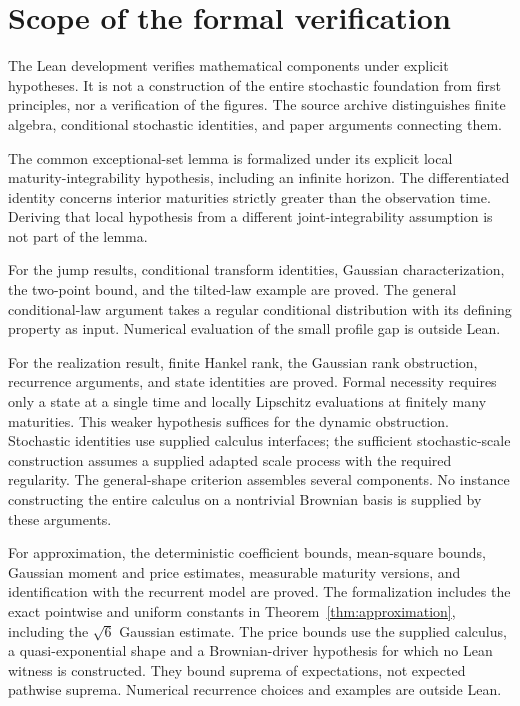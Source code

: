 \section{Scope of the formal verification}\label{app:verification}
The Lean development verifies mathematical components under explicit hypotheses. It is not a construction of the entire stochastic foundation from first principles, nor a verification of the figures. The source archive distinguishes finite algebra, conditional stochastic identities, and paper arguments connecting them.

The common exceptional-set lemma is formalized under its explicit local maturity-integrability hypothesis, including an infinite horizon. The differentiated identity concerns interior maturities strictly greater than the observation time. Deriving that local hypothesis from a different joint-integrability assumption is not part of the lemma.

For the jump results, conditional transform identities, Gaussian characterization, the two-point bound, and the tilted-law example are proved. The general conditional-law argument takes a regular conditional distribution with its defining property as input. Numerical evaluation of the small profile gap is outside Lean.

For the realization result, finite Hankel rank, the Gaussian rank obstruction, recurrence arguments, and state identities are proved. Formal necessity requires only a state at a single time and locally Lipschitz evaluations at finitely many maturities. This weaker hypothesis suffices for the dynamic obstruction. Stochastic identities use supplied calculus interfaces; the sufficient stochastic-scale construction assumes a supplied adapted scale process with the required regularity. The general-shape criterion assembles several components. No instance constructing the entire calculus on a nontrivial Brownian basis is supplied by these arguments.

For approximation, the deterministic coefficient bounds, mean-square bounds, Gaussian moment and price estimates, measurable maturity versions, and identification with the recurrent model are proved. The formalization includes the exact pointwise and uniform constants in Theorem~\ref{thm:approximation}, including the $\sqrt{6}$ Gaussian estimate. The price bounds use the supplied calculus, a quasi-exponential shape and a Brownian-driver hypothesis for which no Lean witness is constructed. They bound suprema of expectations, not expected pathwise suprema. Numerical recurrence choices and examples are outside Lean.


